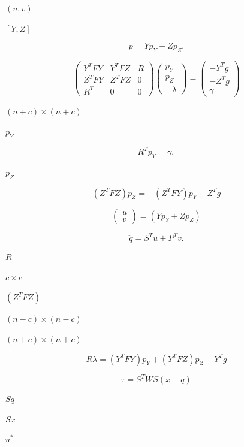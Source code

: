 \documentclass{article}
\begin{document}
$(u,v)$
\pagebreak

$[Y,Z]$
\pagebreak

\[
   p = Y p_Y + Z p_Z.
 \]
\pagebreak

\[
   \left( \begin{array}{ccc}
           Y^T F Y & Y^T F Z & R \\
           Z^T F Y & Z^T F Z & 0 \\
           R^T & 0 & 0  
           \end{array}
   \right)
   \left( \begin{array}{c}
             p_Y \\
             p_Z \\
            -\lambda 
           \end{array}
   \right)
   =
 \left( \begin{array}{c}
             -Y^T g \\
            -Z^T g \\ 
            \gamma 
           \end{array}
   \right)        
 \]
\pagebreak

$(n+c) \times (n+c)$
\pagebreak

$p_Y$
\pagebreak

\[
   R^T p_Y = \gamma,
 \]
\pagebreak

$p_Z$
\pagebreak

\[
   (Z^T F Z) p_Z = -(Z^T F Y)p_Y - Z^T g
 \]
\pagebreak

\[\left(
    \begin{array}{c}
     u \\ 
     v
    \end{array} \right) = (Y p_Y + Z p_Z)
 \]
\pagebreak

\[
   \ddot{q} = S^T u + P^T v.
 \]
\pagebreak

$R$
\pagebreak

$ c \times c $
\pagebreak

$ (Z^T F Z)$
\pagebreak

$ (n-c) \times (n-c) $
\pagebreak

$ (n+c) \times (n+c) $
\pagebreak

\[
   R \lambda = (Y^T FY)p_Y + (Y^T F Z)p_Z + Y^T g
 \]
\pagebreak

\[
   \tau = S^T W S (x-\ddot{q})
 \]
\pagebreak

$S \ddot{q}$
\pagebreak

$S x$
\pagebreak

$u^*$
\pagebreak
\end{document}
